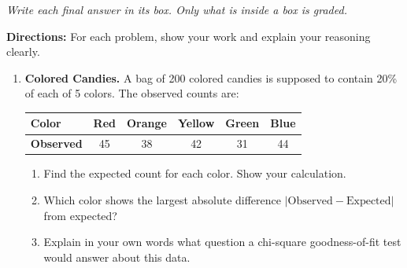 \documentclass[10pt]{article}
\begin{document}
{\small\itshape Write each final answer in its box. Only what is inside a box is graded.}\par

\vspace{0.1in}
\textbf{Directions:} For each problem, show your work and explain your reasoning clearly.

\begin{enumerate}

  \item \textbf{Colored Candies.} A bag of 200 colored candies is supposed to contain
        20\% of each of 5 colors. The observed counts are:

        \vspace{0.05in}
        \renewcommand{\arraystretch}{1.3}
        \begin{tabularx}{0.75\linewidth}{Xccccc}
            \textbf{Color}    & Red & Orange & Yellow & Green & Blue \\
            \hline
            \textbf{Observed} & 45  & 38     & 42     & 31    & 44   \\
        \end{tabularx}

        \begin{enumerate}[label=\alph*.]
          \item Find the expected count for each color. Show your calculation.

          \item Which color shows the largest absolute difference
                $|\text{Observed} - \text{Expected}|$ from expected?

          \boxguard[15]
          \item Explain in your own words what question a chi-square goodness-of-fit
                test would answer about this data.
        \end{enumerate}


\end{enumerate}
\end{document}
